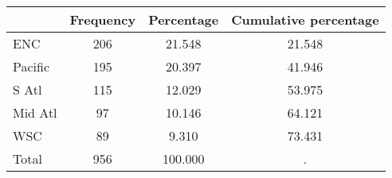 \begin{tabular}{l*{3}{c}}
\hline\hline
            &   Frequency&  Percentage&Cumulative percentage\\
\hline
ENC         &         206&      21.548&      21.548\\
Pacific     &         195&      20.397&      41.946\\
S Atl       &         115&      12.029&      53.975\\
Mid Atl     &          97&      10.146&      64.121\\
WSC         &          89&       9.310&      73.431\\
Total       &         956&     100.000&           .\\
\hline\hline
\end{tabular}
